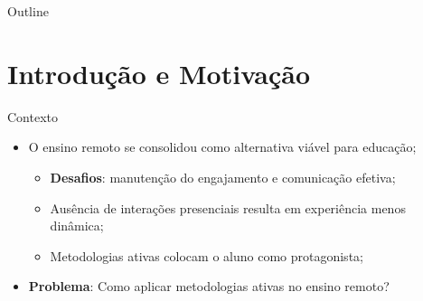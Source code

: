 \documentclass[aspectratio=169]{beamer}
\begin{document}
{%
\begin{frame}{Outline}
  \tableofcontents
\end{frame}

\section{Introdução e Motivação}

\begin{frame}{Contexto}
  \begin{itemize}
  \item O ensino remoto se consolidou como alternativa viável para educação;
    \begin{itemize}
    \item \textbf{Desafios}: manutenção do engajamento e comunicação efetiva;
    \item Ausência de interações presenciais resulta em experiência menos dinâmica;
    \item Metodologias ativas colocam o aluno como protagonista;
    \end{itemize}
  \item \textbf{Problema}: Como aplicar metodologias ativas no ensino remoto?
  \end{itemize}
\end{frame}

}
\end{document}
